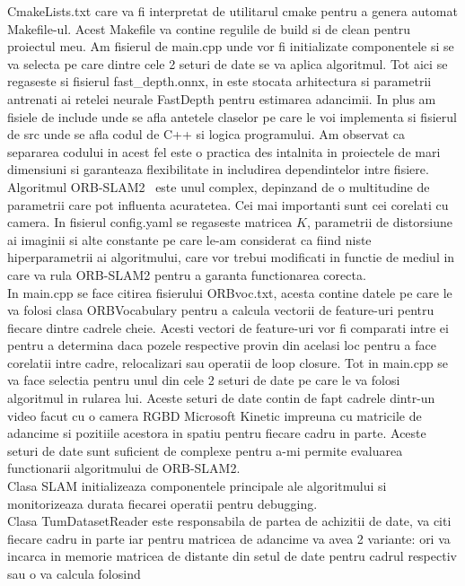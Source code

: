 \documentclass[12pt,a4paper]{report}
\begin{document}
CmakeLists.txt care va fi interpretat de utilitarul cmake pentru a genera automat Makefile-ul. 
Acest Makefile va contine regulile de build si de clean pentru proiectul meu. Am fisierul de 
main.cpp unde vor fi initializate componentele si se va selecta pe care dintre cele 2 seturi
de date se va aplica algoritmul. Tot aici se regaseste si fisierul fast\_depth.onnx, in este 
stocata arhitectura si parametrii antrenati ai retelei neurale FastDepth pentru estimarea 
adancimii. In plus am fisiele de include unde se afla antetele claselor pe care le voi 
implementa si fisierul de src unde se afla codul de C++ si logica programului. Am observat ca 
separarea codului in acest fel este o practica des intalnita in proiectele de mari dimensiuni 
si garanteaza flexibilitate in includirea dependintelor intre fisiere. Algoritmul ORB-SLAM2 \
este unul complex, depinzand de o multitudine de parametrii care pot influenta acuratetea.
Cei mai importanti sunt cei corelati cu camera. In fisierul config.yaml se regaseste matricea \(K\), 
parametrii de distorsiune ai imaginii si alte constante pe care le-am considerat ca fiind niste
hiperparametrii ai algoritmului, care vor trebui modificati in functie de mediul in care va rula
ORB-SLAM2 pentru a garanta functionarea corecta. \\
In main.cpp se face citirea fisierului ORBvoc.txt, acesta contine datele pe care le va folosi
clasa ORBVocabulary pentru a calcula vectorii de feature-uri pentru fiecare dintre cadrele cheie.
Acesti vectori de feature-uri vor fi comparati intre ei pentru a determina daca pozele respective 
provin din acelasi loc pentru a face corelatii intre cadre, relocalizari sau operatii de loop
closure. Tot in main.cpp se va face selectia pentru unul din cele 2 seturi de date pe care le va
folosi algoritmul in rularea lui. Aceste seturi de date contin de fapt cadrele dintr-un video 
facut cu o camera RGBD Microsoft Kinetic impreuna cu matricile de adancime si pozitiile acestora
in spatiu pentru fiecare cadru in parte. Aceste seturi de date sunt suficient de complexe pentru 
a-mi permite evaluarea functionarii algoritmului de ORB-SLAM2. \\
Clasa SLAM initializeaza componentele principale ale algoritmului si monitorizeaza durata 
fiecarei operatii pentru debugging. \\       
Clasa TumDatasetReader este responsabila de partea de achizitii de date, va citi fiecare 
cadru in parte iar pentru matricea de adancime va avea 2 variante: ori va incarca in memorie 
matricea de distante din setul de date pentru cadrul respectiv sau o va calcula folosind 
\end{document}
